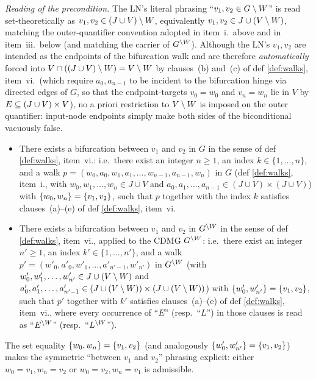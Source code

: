 \documentclass[main]{subfiles}
\begin{document}
\begin{Rem}[MargPreservesAncestors]
\begin{enumerate}[label=\roman*.)]
\begin{enumerate}[label=(\alph*)]
                    \emph{Reading of the precondition.} The LN's literal phrasing ``$v_1, v_2 \in G \setminus W$'' is read set-theoretically as $v_1, v_2 \in (J \cup V) \setminus W$, equivalently $v_1, v_2 \in J \cup (V \setminus W)$, matching the outer-quantifier convention adopted in item~i.\ above and in item~iii.\ below (and matching the carrier of $G^{\setminus W}$). Although the LN's $v_1, v_2$ are intended as the endpoints of the bifurcation walk and are therefore \emph{automatically} forced into $V \cap ((J \cup V) \setminus W) = V \setminus W$ by clauses~(b) and~(c) of def \ref{def:walks}, item~vi.\ (which require $a_0, a_{n-1}$ to be incident to the bifurcation hinge via directed edges of $G$, so that the endpoint-targets $v_0 = w_0$ and $v_n = w_n$ lie in $V$ by $E \subseteq (J \cup V) \times V$), no a priori restriction to $V \setminus W$ is imposed on the outer quantifier: input-node endpoints simply make both sides of the biconditional vacuously false.
                    \begin{itemize}
                        \item There exists a bifurcation between $v_1$ and $v_2$ in $G$ in the sense of def \ref{def:walks}, item~vi.: i.e.\ there exist an integer $n \ge 1$, an index $k \in \{1, \dots, n\}$, and a walk $p = (w_0, a_0, w_1, a_1, \dots, w_{n-1}, a_{n-1}, w_n)$ in $G$ (def \ref{def:walks}, item~i., with $w_0, w_1, \dots, w_n \in J \cup V$ and $a_0, a_1, \dots, a_{n-1} \in (J \cup V) \times (J \cup V)$) with $\left \{ w_0, w_n \right \} = \left \{ v_1, v_2 \right \}$, such that $p$ together with the index $k$ satisfies clauses~(a)--(e) of def \ref{def:walks}, item~vi.
                        \item There exists a bifurcation between $v_1$ and $v_2$ in $G^{\setminus W}$ in the sense of def \ref{def:walks}, item~vi., applied to the CDMG $G^{\setminus W}$: i.e.\ there exist an integer $n' \ge 1$, an index $k' \in \{1, \dots, n'\}$, and a walk $p' = (w'_0, a'_0, w'_1, \dots, a'_{n' - 1}, w'_{n'})$ in $G^{\setminus W}$ (with $w'_0, w'_1, \dots, w'_{n'} \in J \cup (V \setminus W)$ and $a'_0, a'_1, \dots, a'_{n' - 1} \in (J \cup (V \setminus W)) \times (J \cup (V \setminus W))$) with $\left \{ w'_0, w'_{n'} \right \} = \left \{ v_1, v_2 \right \}$, such that $p'$ together with $k'$ satisfies clauses~(a)--(e) of def \ref{def:walks}, item~vi., where every occurrence of ``$E$'' (resp.\ ``$L$'') in those clauses is read as ``$E^{\setminus W}$'' (resp.\ ``$L^{\setminus W}$'').
                    \end{itemize}
                    The set equality $\left \{ w_0, w_n \right \} = \left \{ v_1, v_2 \right \}$ (and analogously $\left \{ w'_0, w'_{n'} \right \} = \left \{ v_1, v_2 \right \}$) makes the symmetric ``between $v_1$ and $v_2$'' phrasing explicit: either $w_0 = v_1, w_n = v_2$ or $w_0 = v_2, w_n = v_1$ is admissible.


\end{enumerate}
\end{enumerate}
\end{Rem}
\end{document}
